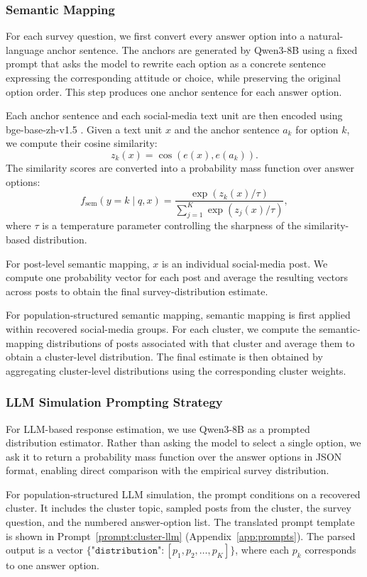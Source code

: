 \documentclass{article}
\begin{document}
\subsubsection{Semantic Mapping}
\label{SSR_sec}
For each survey question, we first convert every answer option into a natural-language anchor sentence.
The anchors are generated by Qwen3-8B using a fixed prompt that asks the model to rewrite each option as a concrete sentence expressing the corresponding attitude or choice, while preserving the original option order.
This step produces one anchor sentence for each answer option.

Each anchor sentence and each social-media text unit are then encoded using bge-base-zh-v1.5 \cite{bge_base_zh_v15}.
Given a text unit $x$ and the anchor sentence $a_k$ for option $k$, we compute their cosine similarity:
\[
z_k(x) = \cos(e(x), e(a_k)).
\]
The similarity scores are converted into a probability mass function over answer options:
\[
f_{\mathrm{sem}}(y=k \mid q,x)
=
\frac{\exp(z_k(x)/\tau)}
{\sum_{j=1}^{K}\exp(z_j(x)/\tau)},
\]
where $\tau$ is a temperature parameter controlling the sharpness of the similarity-based distribution.

For post-level semantic mapping, $x$ is an individual social-media post.
We compute one probability vector for each post and average the resulting vectors across posts to obtain the final survey-distribution estimate.

For population-structured semantic mapping, semantic mapping is first applied within recovered social-media groups.
For each cluster, we compute the semantic-mapping distributions of posts associated with that cluster and average them to obtain a cluster-level distribution.
The final estimate is then obtained by aggregating cluster-level distributions using the corresponding cluster weights.

\subsubsection{LLM Simulation Prompting Strategy}
\label{LLM_prompt}
For LLM-based response estimation, we use Qwen3-8B as a prompted distribution estimator.
Rather than asking the model to select a single option, we ask it to return a probability mass function over the answer options in JSON format, enabling direct comparison with the empirical survey distribution.

For population-structured LLM simulation, the prompt conditions on a recovered cluster.
It includes the cluster topic, sampled posts from the cluster, the survey question, and the numbered answer-option list.
The translated prompt template is shown in Prompt~\ref{prompt:cluster-llm} (Appendix~\ref{app:prompts}). The parsed output is a vector
$\{\texttt{"distribution"}: [p_1, p_2, \ldots, p_K]\}$,
where each $p_k$ corresponds to one answer option.
\end{document}
